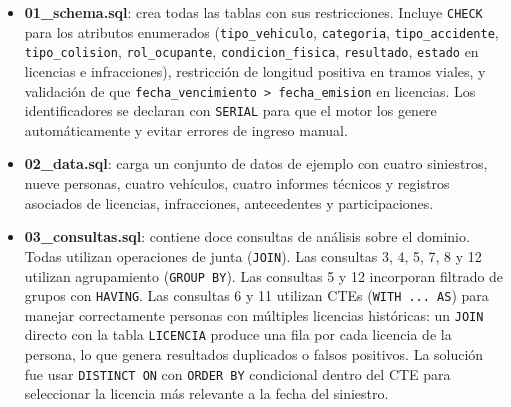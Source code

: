 \documentclass[12pt,a4paper]{article}
\begin{document}
\begin{itemize}[leftmargin=*]
    \item \textbf{01\_schema.sql}: crea todas las tablas con sus restricciones. Incluye \texttt{CHECK} para los atributos enumerados (\texttt{tipo\_vehiculo}, \texttt{categoria}, \texttt{tipo\_accidente}, \texttt{tipo\_colision}, \texttt{rol\_ocupante}, \texttt{condicion\_fisica}, \texttt{resultado}, \texttt{estado} en licencias e infracciones), restricción de longitud positiva en tramos viales, y validación de que \texttt{fecha\_vencimiento > fecha\_emision} en licencias. Los identificadores se declaran con \texttt{SERIAL} para que el motor los genere automáticamente y evitar errores de ingreso manual.

    \item \textbf{02\_data.sql}: carga un conjunto de datos de ejemplo con cuatro siniestros, nueve personas, cuatro vehículos, cuatro informes técnicos y registros asociados de licencias, infracciones, antecedentes y participaciones.

    \item \textbf{03\_consultas.sql}: contiene doce consultas de análisis sobre el dominio. Todas utilizan operaciones de junta (\texttt{JOIN}). Las consultas 3, 4, 5, 7, 8 y 12 utilizan agrupamiento (\texttt{GROUP BY}). Las consultas 5 y 12 incorporan filtrado de grupos con \texttt{HAVING}. Las consultas 6 y 11 utilizan CTEs (\texttt{WITH ... AS}) para manejar correctamente personas con múltiples licencias históricas: un \texttt{JOIN} directo con la tabla \texttt{LICENCIA} produce una fila por cada licencia de la persona, lo que genera resultados duplicados o falsos positivos. La solución fue usar \texttt{DISTINCT ON} con \texttt{ORDER BY} condicional dentro del CTE para seleccionar la licencia más relevante a la fecha del siniestro.


\end{itemize}
\end{document}
